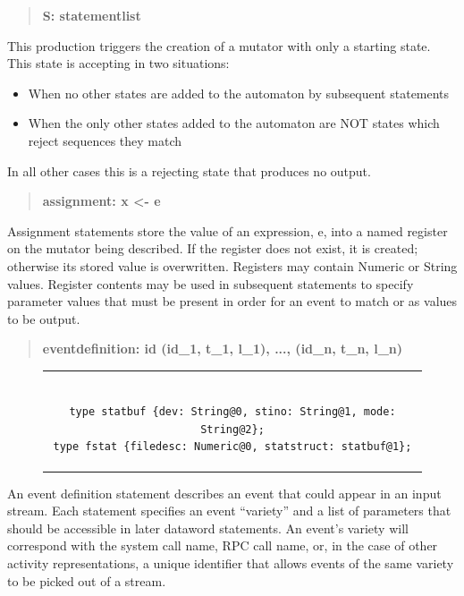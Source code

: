 \begin{quote}
\centering
\textbf{S: statementlist}
\end{quote}

This production triggers the creation of a mutator with only a starting
state.  This state is accepting in two situations:
\begin{itemize}
  \item{When no other states are added to the automaton by subsequent
    statements}
  \item{When the only other states added to the automaton are NOT states
    which reject sequences they match}
\end{itemize}
In all other cases this is a rejecting state that produces no output.

\begin{quote}
\centering
\textbf{assignment: x <- e}
\end{quote}

Assignment statements store the value of an expression, e, into a named
register on the mutator being described.
If the register does not exist,
it is created;
otherwise its stored value is overwritten.
Registers may contain Numeric or String values.  Register contents
may be used in subsequent statements to specify parameter values that must
be present in order for an event to match or as values to be output.

\begin{quote}
\centering
\textbf{eventdefinition: id (id\_1, t\_1, l\_1), ..., (id\_n, t\_n, l\_n) }
\end{quote}

\begin{figure}[H]
\centering
\begin{tabular}{c}
\begin{lstlisting}

type statbuf {dev: String@0, stino: String@1, mode: String@2};
type fstat {filedesc: Numeric@0, statstruct: statbuf@1};

\end{lstlisting}
\end{tabular}
\end{figure}

An event definition statement describes an event that could appear in an input
stream.  Each statement specifies an event ``variety'' and a list of
parameters that should be accessible in later dataword statements.
An event's variety will correspond
with the system call name, RPC call name, or, in the case of other activity
representations, a unique identifier that allows events of the same
variety to be picked out of a stream.


